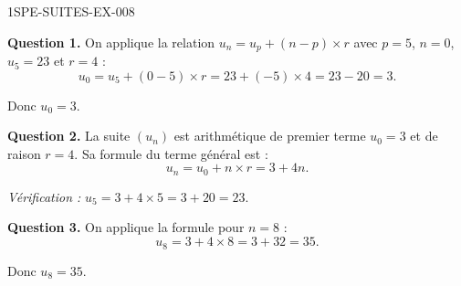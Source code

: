 \begin{corrige}{1SPE-SUITES-EX-008}


\textbf{Question 1.} On applique la relation $u_n = u_p + (n-p) \times r$ avec $p = 5$, $n = 0$, $u_5 = 23$ et $r = 4$ :
\[
u_0 = u_5 + (0 - 5) \times r = 23 + (-5) \times 4 = 23 - 20 = 3.
\]

Donc $u_0 = 3$.


\textbf{Question 2.} La suite $(u_n)$ est arithmétique de premier terme $u_0 = 3$ et de raison $r = 4$. Sa formule du terme général est :
\[
u_n = u_0 + n \times r = 3 + 4n.
\]

\textit{Vérification :} $u_5 = 3 + 4 \times 5 = 3 + 20 = 23$. \checkmark

\textbf{Question 3.} On applique la formule pour $n = 8$ :
\[
u_8 = 3 + 4 \times 8 = 3 + 32 = 35.
\]

Donc $u_8 = 35$.

\end{corrige}
